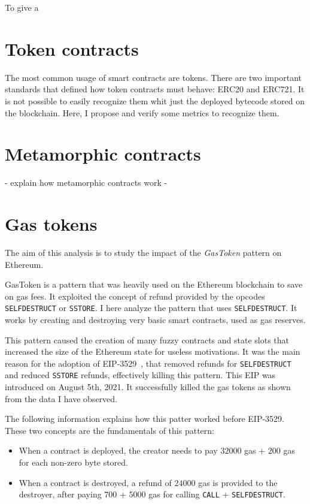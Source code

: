 To give a 

\section{Token contracts}

The most common usage of smart contracts are tokens. There are two important standards that defined how token contracts must behave: ERC20 and ERC721. It is not possible to easily recognize them whit just the deployed bytecode stored on the blockchain. Here, I propose and verify some metrics to recognize them.

\section{Metamorphic contracts}

- explain how metamorphic contracts work
- 

\section{Gas tokens}
\label{gas-tokens}

The aim of this analysis is to study the impact of the \textit{GasToken} pattern on Ethereum.

GasToken is a pattern that was heavily used on the Ethereum blockchain to save on gas fees. It exploited the concept of refund provided by the opcodes {\tt SELFDESTRUCT} or {\tt SSTORE}. 
I here analyze the pattern that uses {\tt SELFDESTRUCT}. It works by creating and destroying very basic smart contracts, used as gas reserves. 

This pattern caused the creation of many fuzzy contracts and state slots that increased the size of the Ethereum state for useless motivations. It was the main reason for the adoption of EIP-3529~\cite{eip-3529}, that removed refunds for {\tt SELFDESTRUCT} and reduced {\tt SSTORE} refunds, effectively killing this pattern. This EIP was introduced on August 5th, 2021. It successfully killed the gas tokens as shown from the data I have observed.

The following information explains how this patter worked before EIP-3529. These two concepts are the fundamentals of this pattern: 

\begin{itemize}
    \item When a contract is deployed, the creator needs to pay $32000$ gas + $200$ gas for each non-zero byte stored.

    \item When a contract is destroyed, a refund of $24000$ gas is provided to the destroyer, after paying $700$ + $5000$ gas for calling {\tt CALL} + {\tt SELFDESTRUCT}. 
\end{itemize}

